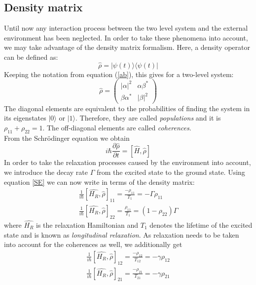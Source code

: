 \documentclass[12pt,a4paper]{article}
\begin{document}
\subsection{Density matrix}\label{DM}
Until now any interaction process between the two level system and the external environment has been neglected. In order to take these phenomena into account, we may take advantage of the density matrix formalism. Here, a density operator can be defined as:
\begin{equation}
\hat{\rho}=|\psi(t)\rangle\langle\psi(t)|
\end{equation}
Keeping the notation from equation (\ref{ab}), this gives for a two-level system:
\begin{equation}
\hat{\rho}=\left(\begin{matrix}
|\alpha|^2&\alpha\beta^*\\\beta\alpha^*&|\beta|^2
\end{matrix}\right)
\end{equation}
The diagonal elements are equivalent to the probabilities of finding the system in its eigenstates $|0\rangle$ or $|1\rangle$. Therefore, they are called  \textit{populations} and it is $\rho_{11}+\rho_{22}=1$. The off-diagonal elements are called \textit{coherences}\cite{nmr}.\\
From the Schr\"odinger equation we obtain\cite{qm}
\begin{equation}\label{SE}
i\hbar\frac{\partial\hat{\rho}}{\partial t}=[\hat{H},\hat{\rho}]
\end{equation}
In order to take the relaxation processes caused by the environment into account, we introduce the decay rate $\Gamma$ from the excited state to the ground state. Using equation \eqref{SE} we can now write in terms of the density matrix: 
\begin{align}
\frac{1}{i\hbar}[\hat{H_R},\hat{\rho}]_{11}=\frac{-\rho_{11}}{T_1}=-\Gamma\rho_{11}\\
\frac{1}{i\hbar}[\hat{H_R},\hat{\rho}]_{22}=\frac{\rho_{11}}{T_1}=(1-\rho_{22})\Gamma
\end{align}
where $\hat{H_R}$ is the relaxation Hamiltonian and $T_1$ denotes the lifetime of the excited state and is known as \textit{longitudinal relaxation}.
As relaxation needs to be taken into account for the coherences as well, we additionally get
\begin{align}
\frac{1}{i\hbar}[\hat{H_R},\hat{\rho}]_{12}=\frac{-\rho_{12}}{T_{12}}=-\gamma\rho_{12}\\
\frac{1}{i\hbar}[\hat{H_R},\hat{\rho}]_{21}=\frac{-\rho_{21}}{T_{21}}=-\gamma\rho_{21}
\end{align}
\end{document}
